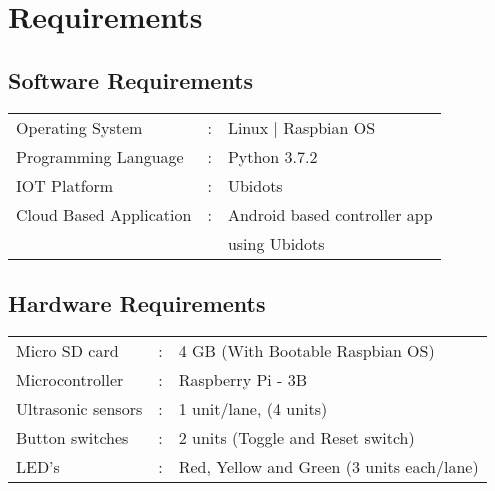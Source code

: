 \chapter{Requirements}

\section{Software Requirements}

\begin{tabular}{lcl}
Operating System & : & Linux | Raspbian OS\\
Programming Language & : & Python 3.7.2\\
IOT Platform & : & Ubidots\\
Cloud Based Application & : & Android based controller app\\
& &  using Ubidots
\end{tabular}

\section{Hardware Requirements}

\begin{tabular}{lcl}
Micro SD card & : & 4 GB (With Bootable Raspbian OS)\\
Microcontroller & : & Raspberry Pi - 3B\\
Ultrasonic sensors & : & 1 unit/lane, (4 units)\\
Button switches & : & 2 units (Toggle and Reset switch)\\
LED’s & : & Red, Yellow and Green (3 units each/lane)\\
\end{tabular}

\pagebreak